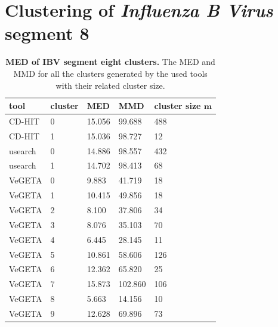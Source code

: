     \section{Clustering of \textit{Influenza B Virus} segment 8}\label{sec:3.1}
    
    \begin{table}[!htb]
        \centering
        \begin{tabu} to 1\textwidth{X[1.2,l]X[1,r]X[1,r]X[1,r]X[1.3,r]}
            \toprule
    		\textbf{tool} & \ltab\textbf{cluster} & \ltab\textbf{MED} & \ltab\textbf{MMD} & \ltab\textbf{cluster size $\bm{m}$}\\
    		\midrule
    		CD-HIT&0&15.056& 99.688 &488\\
            CD-HIT&1&15.036& 98.727 &12\\
            usearch&0&14.886& 98.557 &432\\
            usearch&1&14.702& 98.413 &68\\
            VeGETA&0&9.883& 41.719 &18\\
            VeGETA&1&10.415& 49.856 &18\\
            VeGETA&2&8.100& 37.806 &34\\
            VeGETA&3&8.076& 35.103 &70\\
            VeGETA&4&6.445& 28.145 &11\\
            VeGETA&5&10.861& 58.606 &126\\
            VeGETA&6&12.362& 65.820 &25\\
            VeGETA&7&15.873& 102.860 &106\\
            VeGETA&8&5.663& 14.156 &10\\
            VeGETA&9&12.628& 69.896 &73\\
    		\bottomrule
    	\end{tabu}
    	\caption[\gls{MED} of \gls{IBV} segment eight clusters]{\textbf{\gls{MED} of \gls{IBV} segment eight clusters.} The \gls{MED} and \gls{MMD} for all the clusters generated by the used tools with their related cluster size.}
        \label{tab:3.1}
    \end{table}
     
